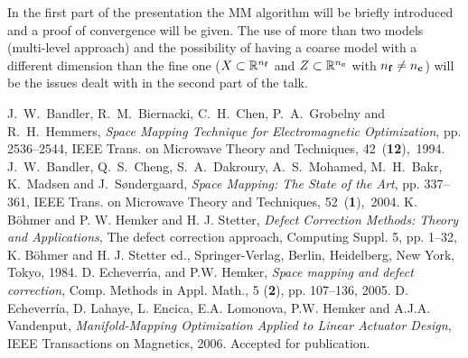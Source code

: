 \documentclass{report}
\begin{document}
In the first part of the presentation the MM algorithm will be
briefly introduced and a proof of convergence will be given. The use
of more than two models (multi-level approach) and the possibility
of having a coarse model with a different dimension than the fine
one ($X \subset \mathbb{R}^{n_{\mathbf f}}$ and $Z \subset \mathbb{R}^{n_{\mathbf c}}$ with $n_{\mathbf f}
\neq n_{\mathbf c}$) will be the issues dealt with in the second part of the
talk.

\begin{thebibliography}{1}
 J.~W.~Bandler, R.~M.~Biernacki,
C.~H.~Chen, P.~A.~Grobelny and R.~H.~Hemmers,
{\em Space Mapping Technique for Electromagnetic Optimization},
pp. 2536--2544, IEEE Trans. on Microwave Theory and Techniques,
\mbox{42 ({\bf 12}), 1994}.
 J.~W.~Bandler, Q.~S.~Cheng, S.~A.~Dakroury,
A.~S.~Mohamed, M.~H.~Bakr, K.~Madsen and J.~S{\o}ndergaard,
{\em Space Mapping: The State of the Art}, pp. 337--361, IEEE Trans. on Microwave
Theory and Techniques, \mbox{52 ({\bf 1}), 2004}.
 K. B{\"o}hmer and P. W. Hemker and H. J. Stetter, {\em
Defect Correction Methods: Theory and Applications}, The defect
correction approach, Computing Suppl. 5, pp. 1--32, K. B{\"o}hmer and H.
J. Stetter ed., Springer-Verlag, Berlin, Heidelberg, New York, Tokyo,
1984.
 D. Echeverr\'{\i}a, and P.W. Hemker, {\em Space mapping
and defect correction}, Comp. Methods in Appl. Math., 5 ({\bf 2}), pp.
107--136, 2005.
 D. Echeverr\'{i}a, D. Lahaye, L. Encica, E.A. Lomonova,
P.W. Hemker and A.J.A. Vandenput,
{\em Manifold-Mapping Optimization Applied to Linear Actuator Design},
IEEE Transactions on Magnetics, 2006. Accepted for publication.
\end{thebibliography}
\thispagestyle{empty}
\end{document}
